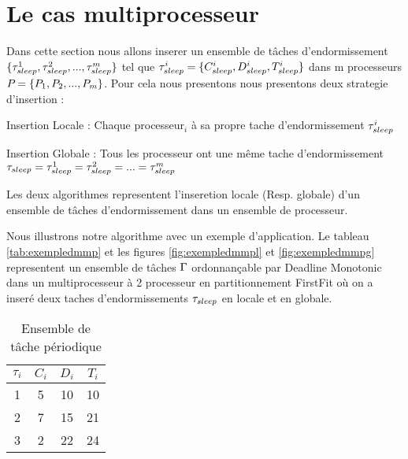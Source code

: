 \section{Le cas multiprocesseur}
\indent Dans cette section nous allons inserer un ensemble de tâches d'endormissement $\{\tau_{sleep}^1,\tau_{sleep}^2,...,\tau_{sleep}^m\}$ tel que $\tau_{sleep}^i = \{ C_{sleep}^i, D_{sleep}^i, T_{sleep}^i\}$
dans m processeurs $P_{} = \{P_{1},P_{2},...,P_{m}\}$.
\indent Pour cela nous presentons nous presentons deux strategie d'insertion :
\begin{description}
\item{Insertion Locale :} Chaque processeur$_i$ à sa propre tache d'endormissement $\tau_{sleep}^i$
\item{Insertion Globale :} Tous les processeur ont une même tache d'endormissement $\tau_{sleep}=\tau_{sleep}^1=\tau_{sleep}^2=...=\tau_{sleep}^m$
\end{description}
\indent Les deux algorithmes representent l'inseretion locale (Resp. globale) d'un ensemble de tâches d'endormissement dans un ensemble de processeur.
 
 
\indent Nous illustrons notre algorithme avec un exemple d'application. Le tableau \ref{tab:exempledmmp} et les figures \ref{fig:exempledmmpl} et \ref{fig:exempledmmpg} representent un ensemble de tâches $\Gamma$ 
ordonnançable par Deadline Monotonic dans un multiprocesseur à 2 processeur en partitionnement FirstFit où on a inseré deux taches d'endormissements $\tau_{sleep}$ en locale et en globale.
\begin{table}[!h]
\begin{center}
\begin{tabular}{|c|c|c|c|}
 \hline$\tau_i$ & $C_i$ & $D_i$ & $T_i$ \\ 
 \hline1 & 5 & 10 & 10 \\ 
 \hline 2 & 7 & 15 & 21 \\ 
 \hline 3 & 2 & 22 & 24 \\ 
 \hline 
 \end{tabular}
\end{center}
\caption{Ensemble de tâche périodique} \label{tab:dmmp}
\end{table}
